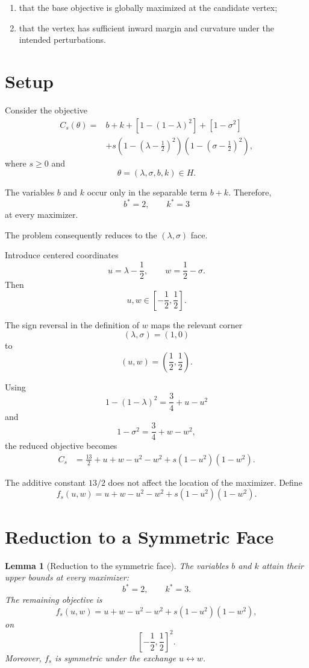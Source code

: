 \documentclass[11pt]{article}
\newtheorem{lemma}[theorem]{Lemma}
\theoremstyle{remark}
\begin{document}
\begin{enumerate}[label=\arabic*.]
    \item that the base objective is globally maximized at the candidate vertex;
    \item that the vertex has sufficient inward margin and curvature under the
    intended perturbations.
\end{enumerate}

\section{Setup}

Consider the objective
\begin{align}
C_s(\theta)
={}& b+k+
\left[1-(1-\lambda)^2\right]
+\left[1-\sigma^2\right]
\nonumber\\
&+
s\left(1-\left(\lambda-\frac12\right)^2\right)
\left(1-\left(\sigma-\frac12\right)^2\right),
\end{align}
where $s\geq 0$ and
\[
\theta=(\lambda,\sigma,b,k)\in H.
\]

The variables $b$ and $k$ occur only in the separable term $b+k$. Therefore,
\[
b^*=2,\qquad k^*=3
\]
at every maximizer.

The problem consequently reduces to the $(\lambda,\sigma)$ face.

Introduce centered coordinates
\[
u=\lambda-\frac12,
\qquad
w=\frac12-\sigma.
\]
Then
\[
u,w\in\left[-\frac12,\frac12\right].
\]

The sign reversal in the definition of $w$ maps the relevant corner
\[
(\lambda,\sigma)=(1,0)
\]
to
\[
(u,w)=\left(\frac12,\frac12\right).
\]

Using
\[
1-(1-\lambda)^2
=
\frac34+u-u^2
\]
and
\[
1-\sigma^2
=
\frac34+w-w^2,
\]
the reduced objective becomes
\begin{align}
C_s
&=
\frac{13}{2}
+
u+w-u^2-w^2
+
s(1-u^2)(1-w^2).
\end{align}

The additive constant $13/2$ does not affect the location of the maximizer. Define
\[
f_s(u,w)
=
u+w-u^2-w^2+s(1-u^2)(1-w^2).
\]

\section{Reduction to a Symmetric Face}

\begin{lemma}[Reduction to the symmetric face]
The variables $b$ and $k$ attain their upper bounds at every maximizer:
\[
b^*=2,\qquad k^*=3.
\]
The remaining objective is
\[
f_s(u,w)
=
u+w-u^2-w^2+s(1-u^2)(1-w^2),
\]
on
\[
\left[-\frac12,\frac12\right]^2.
\]
Moreover, $f_s$ is symmetric under the exchange $u\leftrightarrow w$.
\end{lemma}
\end{document}
